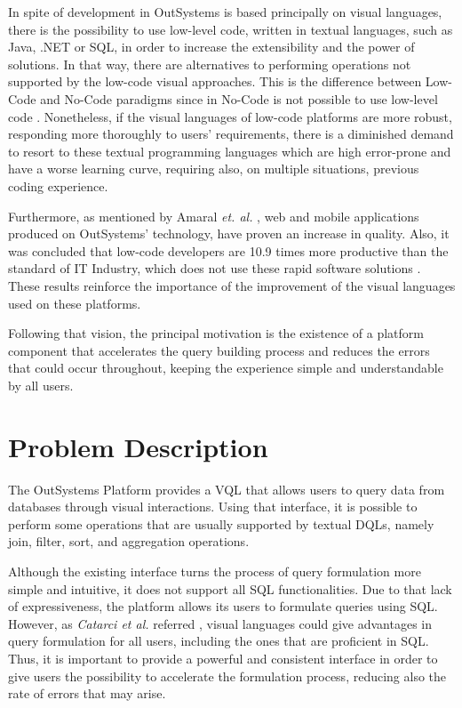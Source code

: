 In spite of development in OutSystems is based principally on visual languages, there is the possibility to use low-level code, written in textual languages, such as Java, .NET or \gls{SQL}, in order to increase the extensibility and the power of solutions.  In that way, there are alternatives to performing operations not supported by the low-code visual approaches. This is the difference between Low-Code and No-Code paradigms since in No-Code is not possible to use low-level code \cite{outsystems_lowcodeVsNocode}. Nonetheless, if the visual languages of low-code platforms are more robust, responding more thoroughly to users’ requirements, there is a diminished demand to resort to these textual programming languages which are high error-prone and have a worse learning curve, requiring also, on multiple situations, previous coding experience.

Furthermore, as mentioned by  Amaral \textit{et. al.} \cite{improvingTheDeveloperExperienceWithALowCodeProcessModellingLanguage}, web and mobile applications produced on OutSystems’ technology, have proven an increase in quality. Also, it was concluded that low-code developers are 10.9 times more productive than the standard of \gls{IT} Industry, which does not use these rapid software solutions \cite{outByNumbers2013}. These results reinforce the importance of the improvement of the visual languages used on these platforms.

Following that vision, the principal motivation is the existence of a platform component that accelerates the query building process and reduces the errors that could occur throughout, keeping the experience simple and understandable by all users.

\section{Problem Description}
\label{sec:problem_description}
The OutSystems Platform \cite{outsystemsPlatform} provides a \gls{VQL} that allows users to query data from databases through visual interactions. Using that interface, it is possible to perform some operations that are usually supported by textual \glspl{DQL}, namely join, filter, sort, and aggregation operations.

Although the existing interface turns the process of query formulation more simple and intuitive, it does not support all \gls{SQL} functionalities. Due to that lack of expressiveness, the platform allows its users to formulate queries using SQL. However, as \textit{Catarci et al.} referred \cite{diagrammaticVsTextualQueryLanguages_aComparativeExperiment}, visual languages could give advantages in query formulation for all users, including the ones that are proficient in SQL. Thus, it is important to provide a powerful and consistent interface in order to give users the possibility to accelerate the formulation process, reducing also the rate of errors that may arise. 

